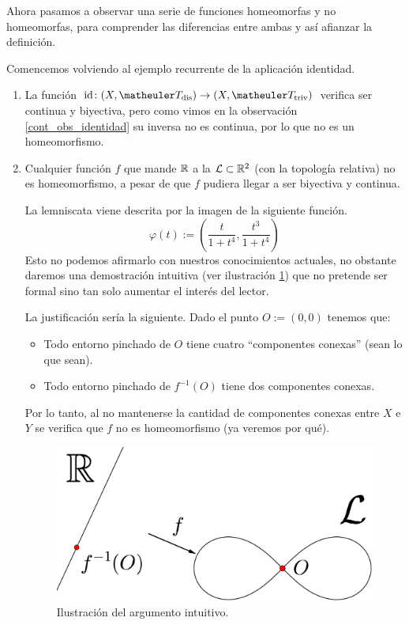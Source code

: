 Ahora pasamos a observar una serie de funciones homeomorfas y no homeomorfas, para comprender las diferencias entre ambas y así afianzar la definición.
\label{etop_exa_homeomorfismos}
\begin{exa}[Homeomorfismos] Comencemos volviendo al ejemplo recurrente de la aplicación identidad.
	\begin{enumerate}
		\item La función $\text{id}\colon(X,\T_{\text{dis}})\rightarrow(X,\T_\text{triv})$ verifica ser continua y biyectiva, pero como vimos en la observación \ref{cont_obs_identidad} su inversa no es continua, por lo que no es un homeomorfismo. 
		
		\item Cualquier función $f$ que mande $\mathbb{R}$ a la  $\mathcal{L}\subset\mathbb{R}^2$ (con la topología relativa) no es homeomorfismo, a pesar de que $f$ pudiera llegar a ser biyectiva y continua.
		
		La lemniscata viene descrita por la imagen de la siguiente función.
		\[\varphi(t):=\left(\frac{t}{1+t^4},\frac{t^3}{1+t^4}\right)\]
		Esto no podemos afirmarlo con nuestros conocimientos actuales, no obstante daremos una demostración intuitiva (ver ilustración \ref{cont_img_lemins}) que no pretende ser formal sino tan solo aumentar el interés del lector.
		
		La justificación sería la siguiente. Dado el punto $O:=(0,0)$ tenemos que:
		\begin{itemize}
			\item Todo entorno pinchado de $O$ tiene cuatro ``componentes conexas'' (sean lo que sean).
			\item Todo entorno pinchado de $f^{-1}(O)$ tiene dos componentes conexas.
		\end{itemize}
		
		Por lo tanto, al no mantenerse la cantidad de componentes conexas entre $X$ e $Y$ se verifica que $f$ no es homeomorfismo (ya veremos por qué).
		\begin{figure}[h!]
			\centering
			\includegraphics[scale = 0.075]{img/lemniscata}
			\caption{Ilustración del argumento intuitivo.}
			\label{cont_img_lemins}
		\end{figure}
		

\end{enumerate}
\end{exa}
